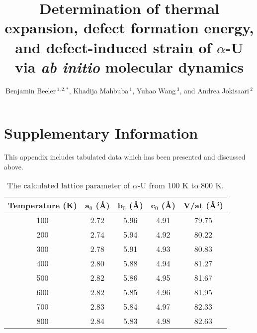 \documentclass[utf8]{frontiersSCNS} %
\def\firstAuthorLast{Beeler {et~al.}}
\def\Authors{Benjamin Beeler\,$^{1,2,*}$, Khadija Mahbuba\,$^{1}$, Yuhao Wang\,$^{3}$, and Andrea Jokisaari\,$^{2}$}
\begin{document}
\onecolumn
{}

\title[AIMD calculation of temperature-dependent properties of $\alpha$-U]{Determination of thermal expansion, defect formation energy, and defect-induced strain of $\alpha$-U via \textit{ab initio} molecular dynamics} 

\author[\firstAuthorLast ]{\Authors} %
\address{} %
\correspondance{} %

\extraAuth{}%



\section{Supplementary Information}

This appendix includes tabulated data which has been presented and discussed above. 

\setcounter{table}{0}
\renewcommand{\thetable}{A\arabic{table}}

\begin{table}[h]
\caption{The calculated lattice parameter of $\alpha$-U from 100 K to 800 K.} \label{tab:lat}
\begin{center}
\begin{tabular}{|c|c|c|c|c|}
	\hline
	Temperature (K) & a$_0$ (\AA) & b$_0$ (\AA) & c$_0$ (\AA) & V/at (\AA$^3$) \\
	 \hline
100 &	2.72	& 5.96	& 4.91 &	79.75 \\
200 &	2.74 &	5.94 &	4.92 &	80.22  \\
300 &	2.78	& 5.91 &	4.93	& 80.83 \\
400 &	2.80 &	5.88 &	4.94	& 81.27 \\
500 &	2.82 &	5.86 &	4.95	& 81.67 \\
600 &	2.82 &	5.85 &	4.96	& 81.95 \\
700 &	2.83 &	5.84 &	4.97	 & 82.33 \\
800 &	2.84 &	5.83 &	4.98	& 82.63 \\
	 \hline
\end{tabular}
\end{center}
\label{default}
\end{table}
\end{document}
